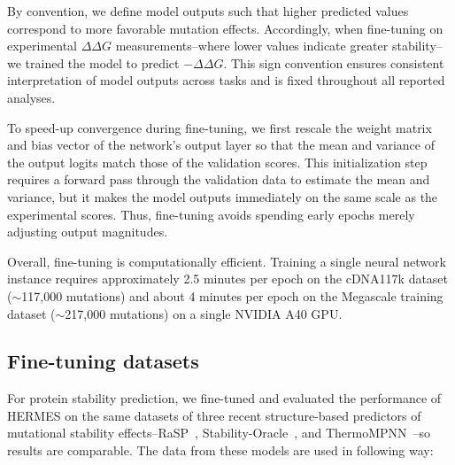 By convention, we define model outputs such that higher predicted values correspond to more
favorable mutation effects. Accordingly, when fine-tuning on experimental $\Delta\Delta G$
measurements--where lower values indicate greater stability--we trained the model to predict
$-\Delta\Delta G$. This sign convention ensures consistent interpretation of model outputs across
tasks and is fixed throughout all reported analyses.

To speed-up convergence during fine-tuning, we first rescale the weight matrix and bias vector of
the network's output layer so that the mean and variance of the output logits match those of the
validation scores. This initialization step requires a forward pass through the validation data to
estimate the mean and variance, but it makes the model outputs immediately on the same scale as the
experimental scores. Thus, fine-tuning avoids spending early epochs merely adjusting output
magnitudes.

Overall, fine-tuning is computationally efficient. Training a single neural network instance
requires approximately 2.5 minutes per epoch on the cDNA117k dataset ($\sim$117,000 mutations) and
about 4 minutes per epoch on the Megascale training dataset ($\sim$217,000 mutations) on a single
NVIDIA A40 GPU.






\subsection{Fine-tuning datasets}
\label{sec:datasets}


 For protein stability prediction, we fine-tuned and
evaluated the performance of HERMES on the same datasets of three recent structure-based predictors
of mutational stability effects--RaSP~\citep{blaabjerg_rapid_2023},
Stability-Oracle~\citep{diaz_stability_2024}, and ThermoMPNN~\citep{dieckhaus_transfer_2024}--so
results are comparable. The data from these models are used in following way:



